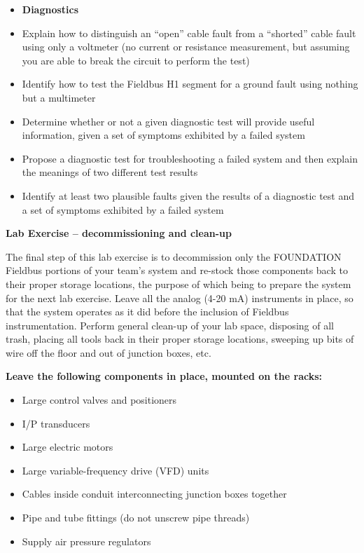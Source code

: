 \begin{itemize}
\item{} {\bf Diagnostics}
\item{} Explain how to distinguish an ``open'' cable fault from a ``shorted'' cable fault using only a voltmeter (no current or resistance measurement, but assuming you are able to break the circuit to perform the test)
\item{} Identify how to test the Fieldbus H1 segment for a ground fault using nothing but a multimeter
\item{} Determine whether or not a given diagnostic test will provide useful information, given a set of symptoms exhibited by a failed system
\item{} Propose a diagnostic test for troubleshooting a failed system and then explain the meanings of two different test results
\item{} Identify at least two plausible faults given the results of a diagnostic test and a set of symptoms exhibited by a failed system
\end{itemize}



\vfil \eject

\noindent
{\bf Lab Exercise -- decommissioning and clean-up}

\vskip 5pt

The final step of this lab exercise is to decommission only the FOUNDATION Fieldbus portions of your team's system and re-stock those components back to their proper storage locations, the purpose of which being to prepare the system for the next lab exercise.  Leave all the analog (4-20 mA) instruments in place, so that the system operates as it did before the inclusion of Fieldbus instrumentation.  Perform general clean-up of your lab space, disposing of all trash, placing all tools back in their proper storage locations, sweeping up bits of wire off the floor and out of junction boxes, etc.

\vskip 10pt

\indent
{\bf Leave the following components in place, mounted on the racks:}

\begin{itemize}
\item{} Large control valves and positioners
\item{} I/P transducers
\item{} Large electric motors
\item{} Large variable-frequency drive (VFD) units
\item{} Cables inside conduit interconnecting junction boxes together
\item{} Pipe and tube fittings (do not unscrew pipe threads)
\item{} Supply air pressure regulators
\end{itemize}

